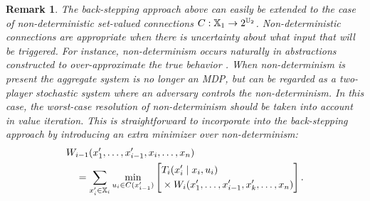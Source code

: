 \documentclass[conference]{IEEEtran}
\renewcommand{\cite}[1]{\citep{#1}}
\newtheorem{remark}{Remark}
\begin{document}


\begin{remark}
	The back-stepping approach above can easily be extended to the case of \emph{non-deterministic} set-valued connections $C : \mathbb{X}_1 \rightarrow 2^{\mathbb{U}_2}$. Non-deterministic connections are appropriate when there is uncertainty about what input that will be triggered. For instance, non-determinism occurs naturally in abstractions constructed to over-approximate the true behavior \cite{Haesaert18}. When non-determinism is present the aggregate system is no longer an MDP, but can be regarded as a two-player stochastic system where an adversary controls the non-determinism. In this case, the worst-case resolution of non-determinism should be taken into account in value iteration. This is straightforward to incorporate into the back-stepping approach by introducing an extra minimizer over non-determinism:
	\begin{equation*}
	\begin{aligned}
	  & W_{i-1}(x_1', \ldots, x_{i-1}', x_i, \ldots, x_n) \\
	  & \quad = \sum_{x_{i}' \in \mathbb{X}_{i}} \min_{u_i \in C(x_{i-1}')} \left[ \begin{aligned} & T_{i} (x_{i}' \mid x_{i}, u_i) \\ 
	   & \times W_{i} (x_1', \ldots, x_{i-1}', x_k', \ldots, x_n)
	    \end{aligned} \right].
	\end{aligned}
	\end{equation*}
\end{remark}


\end{document}
